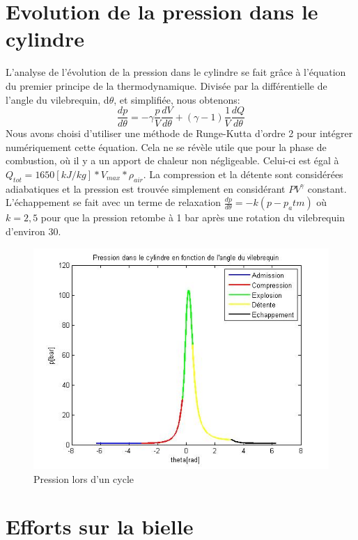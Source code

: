 \documentclass[a4paper,oneside,11pt]{report}
\begin{document}
\section{Evolution de la pression dans le cylindre}

L'analyse de l'évolution de la pression dans le cylindre se fait grâce à l'équation du premier principe de la thermodynamique. Divisée par la différentielle de l'angle du vilebrequin, d$\theta$, et simplifiée, nous obtenons:
$$\frac{dp}{d\theta}=-\gamma\frac{p}{V}\frac{dV}{d\theta}+(\gamma - 1) \frac{1}{V}\frac{dQ}{d\theta}$$
Nous avons choisi d'utiliser une méthode de Runge-Kutta d'ordre 2 pour intégrer numériquement cette équation. Cela ne se révèle utile que pour la phase de combustion, où il y a un apport de chaleur non négligeable. Celui-ci est égal à $Q_{tot}=1650[kJ/kg] * V_{max} * \rho_{air}$. La compression et la détente sont considérées adiabatiques et la pression est trouvée simplement en considérant $PV^{\gamma}$ constant. L'échappement se fait avec un terme de relaxation $\frac{dp}{d\theta}=-k(p-p_atm)$ où $k=2,5$ pour que la pression retombe à 1 bar après une rotation du vilebrequin d'environ 30\degre.

\begin{figure}[H]
	\center
	\includegraphics[scale=0.6]{pression.jpg}
	\caption{Pression lors d'un cycle}
\end{figure}

\section{Efforts sur la bielle}
\end{document}
